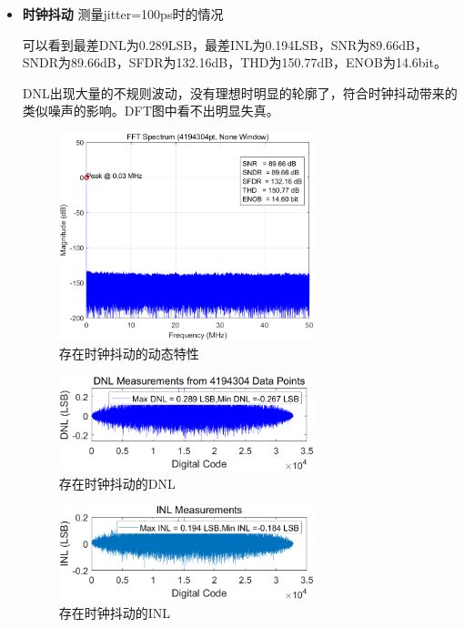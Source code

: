 \documentclass[cs4size,a4paper]{ctexart}
\numberwithin{equation}{section}
\numberwithin{table}{section}
\numberwithin{figure}{section}
\begin{document}
\begin{itemize}
	\item \textbf{时钟抖动} 测量jitter=100ps时的情况
		
		可以看到最差DNL为0.289LSB，最差INL为0.194LSB，SNR为89.66dB，SNDR为89.66dB，SFDR为132.16dB，THD为150.77dB，ENOB为14.6bit。

		DNL出现大量的不规则波动，没有理想时明显的轮廓了，符合时钟抖动带来的类似噪声的影响。DFT图中看不出明显失真。
		\begin{figure}[H]
			\centering
			\includegraphics[width=0.7\textwidth]{pic/jitter/DFT.png}
			\caption{存在时钟抖动的动态特性} 
		\end{figure}

		\begin{figure}[H]
			\centering
			\includegraphics[width=0.7\textwidth]{pic/jitter/DNL.png}
			\caption{存在时钟抖动的DNL} 
		\end{figure}

		\begin{figure}[H]
			\centering
			\includegraphics[width=0.7\textwidth]{pic/jitter/INL.png}
			\caption{存在时钟抖动的INL} 
		\end{figure}
    \end{itemize}
\end{document}
